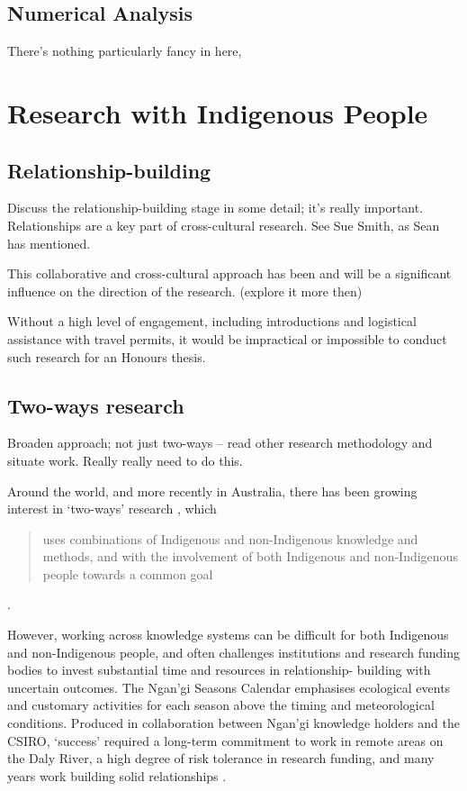\subsection{Numerical Analysis}
There's nothing particularly fancy in here, 






\section{Research with Indigenous People}


\subsection{Relationship-building}
Discuss the relationship-building stage in some detail; it's really important.
Relationships are a key part of cross-cultural research.  See Sue Smith, as 
Sean has mentioned.

This collaborative and cross-cultural approach has been and will be a 
significant influence on the direction of the research. (explore it more then)

Without a high level of engagement, including introductions and logistical
assistance with travel permits, it would be impractical or impossible to conduct
such research for an Honours thesis.


\subsection{Two-ways research}
Broaden approach; not just two-ways – read other research methodology and 
situate work.  Really really need to do this.

Around the world, and more recently in Australia, there has been growing 
interest in `two-ways' research \citep{turner2009,prober2011}, 
which \blockquote{uses combinations of Indigenous and non-Indigenous knowledge and 
methods, and with the involvement of both Indigenous and non-Indigenous people 
towards a common goal} \citep{ens2014}.  

However, working across knowledge systems can be difficult for both Indigenous 
and non-Indigenous people, and often challenges institutions and research 
funding bodies to invest substantial time and resources in relationship-
building with uncertain outcomes.  The Ngan'gi Seasons Calendar emphasises 
ecological events and customary activities for each season above the timing and 
meteorological conditions.  Produced in collaboration between Ngan'gi knowledge 
holders and the CSIRO, `success' required a long-term commitment to work in 
remote areas on the Daly River, a high degree of risk tolerance in 
research funding, and many years work building solid relationships \citep{woodward2010}.


